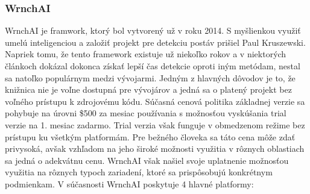 \documentclass[slovak,master,dept460,male,cpp,cpdeclaration]{diploma}
\begin{document}
\subsubsection{WrnchAI}
WrnchAI je framwork, ktorý bol vytvorený už v roku 2014. S myšlienkou využiť umelú inteligenciou a založiť projekt pre detekciu postáv prišiel Paul Kruszewski. Napriek tomu, že tento framework  existuje už niekoľko rokov a v niektorých článkoch\cite{openposeVsWrnchAI} dokázal dokonca získať lepší čas detekcie oproti iným metódam,  nestal sa natoľko populárnym medzi vývojarmi. Jedným z hlavných dôvodov je to, že knižnica nie je voľne dostupná pre vývojárov a jedná sa o platený projekt bez voľného prístupu k zdrojovému kódu. Súčasná cenová politika základnej verzie sa pohybuje na úrovni \$500 za mesiac používania s možnosťou vyskúšania trial verzie na 1. mesiac zadarmo. Trial verzia však funguje v obmedzenom režime  bez prístupu ku všetkým platformám. Pre bežného človeka sa táto cena môže zdať privysoká, avšak vzhľadom na jeho široké možnosti využitia  v rôznych oblastiach sa jedná o adekvátnu cenu. WrnchAI však našiel svoje uplatnenie možnosťou využitia na rôznych typoch zariadení, ktoré sa prispôsobujú konkrétnym podmienkam. V súčasnosti WrnchAI poskytuje 4 hlavné platformy:
\end{document}
